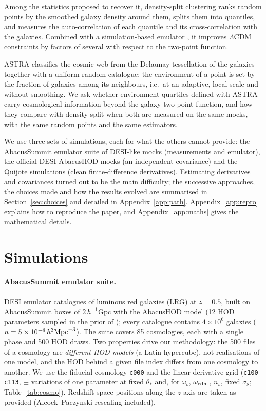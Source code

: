 \documentclass[11pt,twocolumn]{article}
\begin{document}
Among the statistics proposed to recover it, density-split clustering \cite{Paillas2023, Paillas2024} ranks random points by the smoothed galaxy density around them, splits them into quantiles, and measures the auto-correlation of each quantile and its cross-correlation with the galaxies. Combined with a simulation-based emulator \cite{CuestaLazaro2024}, it improves $\Lambda$CDM constraints by factors of several with respect to the two-point function.

ASTRA \cite{ASTRA} classifies the cosmic web from the Delaunay tessellation of the galaxies together with a uniform random catalogue: the environment of a point is set by the fraction of galaxies among its neighbours, i.e.\ at an adaptive, local scale and without smoothing. We ask whether environment quartiles defined with ASTRA carry cosmological information beyond the galaxy two-point function, and how they compare with density split when both are measured on the same mocks, with the same random points and the same estimators.

We use three sets of simulations, each for what the others cannot provide: the AbacusSummit emulator suite of DESI-like mocks (measurements and emulator), the official DESI AbacusHOD mocks (an independent covariance) and the Quijote simulations (clean finite-difference derivatives). Estimating derivatives and covariances turned out to be the main difficulty; the successive approaches, the choices made and how the results evolved are summarised in Section~\ref{sec:choices} and detailed in Appendix~\ref{app:path}. Appendix~\ref{app:repro} explains how to reproduce the paper, and Appendix~\ref{app:maths} gives the mathematical details.

\section{Simulations}
\label{sec:sims}

\paragraph{AbacusSummit emulator suite.} DESI emulator catalogues of luminous red galaxies (LRG) at $z=0.5$, built on AbacusSummit \cite{Maksimova2021} boxes of $2\,h^{-1}$Gpc with the AbacusHOD model \cite{Yuan2022} (12 HOD parameters sampled in the prior of \cite{Yuan2023}); every catalogue contains $4\times10^6$ galaxies ($\bar n = 5\times10^{-4}\,h^3{\rm Mpc}^{-3}$). The suite covers 85 cosmologies, each with a single phase and 500 HOD draws. Two properties drive our methodology: the 500 files of a cosmology are \emph{different HOD models} (a Latin hypercube), not realisations of one model, and the HOD behind a given file index differs from one cosmology to another. We use the fiducial cosmology \texttt{c000} and the linear derivative grid (\texttt{c100}--\texttt{c113}, $\pm$ variations of one parameter at fixed $\theta_*$ and, for $\omega_b$, $\omega_{\rm cdm}$, $n_s$, fixed $\sigma_8$; Table~\ref{tab:cosmo}). Redshift-space positions along the $z$ axis are taken as provided (Alcock--Paczynski rescaling included).
\end{document}
